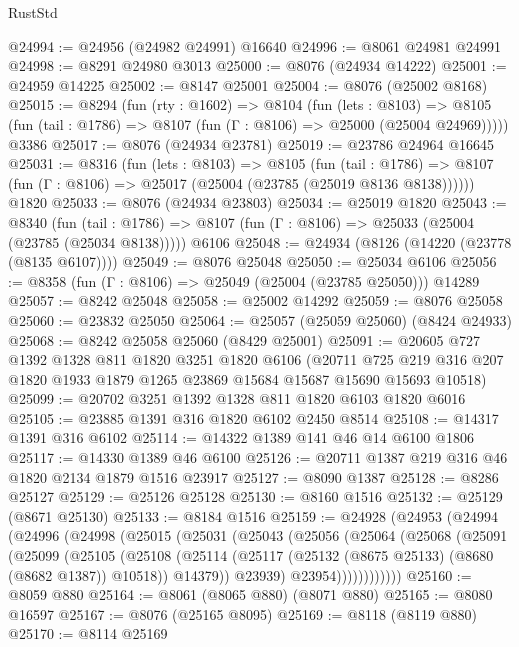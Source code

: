 \begin{lexlean}{RustStd}
\begin{coremodule}
@24994 := @24956 (@24982 @24991) @16640
@24996 := @8061 @24981 @24991
@24998 := @8291 @24980 @3013
@25000 := @8076 (@24934 @14222)
@25001 := @24959 @14225
@25002 := @8147 @25001
@25004 := @8076 (@25002 @8168)
@25015 := @8294
    (fun (rty : @1602) =>
    @8104
      (fun (lets : @8103) =>
      @8105 (fun (tail : @1786) => @8107 (fun (Γ : @8106) => @25000 (@25004 @24969)))))
    @3386
@25017 := @8076 (@24934 @23781)
@25019 := @23786 @24964 @16645
@25031 := @8316
    (fun (lets : @8103) =>
    @8105
      (fun (tail : @1786) =>
      @8107 (fun (Γ : @8106) => @25017 (@25004 (@23785 (@25019 @8136 @8138))))))
    @1820
@25033 := @8076 (@24934 @23803)
@25034 := @25019 @1820
@25043 := @8340
    (fun (tail : @1786) => @8107 (fun (Γ : @8106) => @25033 (@25004 (@23785 (@25034 @8138)))))
    @6106
@25048 := @24934 (@8126 (@14220 (@23778 (@8135 @6107))))
@25049 := @8076 @25048
@25050 := @25034 @6106
@25056 := @8358 (fun (Γ : @8106) => @25049 (@25004 (@23785 @25050))) @14289
@25057 := @8242 @25048
@25058 := @25002 @14292
@25059 := @8076 @25058
@25060 := @23832 @25050
@25064 := @25057 (@25059 @25060) (@8424 @24933)
@25068 := @8242 @25058 @25060 (@8429 @25001)
@25091 := @20605
    @727
    @1392
    @1328
    @811
    @1820
    @3251
    @1820
    @6106
    (@20711 @725 @219 @316 @207 @1820 @1933 @1879 @1265 @23869 @15684 @15687 @15690 @15693 @10518)
@25099 := @20702 @3251 @1392 @1328 @811 @1820 @6103 @1820 @6016
@25105 := @23885 @1391 @316 @1820 @6102 @2450 @8514
@25108 := @14317 @1391 @316 @6102
@25114 := @14322 @1389 @141 @46 @14 @6100 @1806
@25117 := @14330 @1389 @46 @6100
@25126 := @20711 @1387 @219 @316 @46 @1820 @2134 @1879 @1516 @23917
@25127 := @8090 @1387
@25128 := @8286 @25127
@25129 := @25126 @25128
@25130 := @8160 @1516
@25132 := @25129 (@8671 @25130)
@25133 := @8184 @1516
@25159 := @24928
    (@24953
      (@24994
        (@24996
          (@24998
            (@25015
              (@25031
                (@25043
                  (@25056
                    (@25064
                      (@25068
                        (@25091
                          (@25099
                            (@25105
                              (@25108
                                (@25114
                                  (@25117 (@25132 (@8675 @25133) (@8680 (@8682 @1387)) @10518))
                                  @14379))
                              @23939)
                            @23954))))))))))))
@25160 := @8059 @880
@25164 := @8061 (@8065 @880) (@8071 @880)
@25165 := @8080 @16597
@25167 := @8076 (@25165 @8095)
@25169 := @8118 (@8119 @880)
@25170 := @8114 @25169

\end{coremodule}
\end{lexlean}
